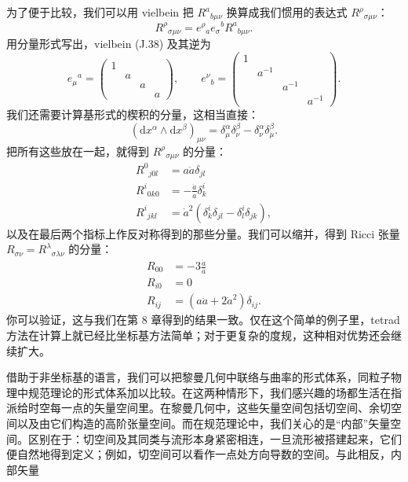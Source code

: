 为了便于比较，我们可以用 vielbein 把 $R^{a}{}_{b\mu\nu}$ 换算成我们惯用的表达式 $R^{\rho}{}_{\sigma\mu\nu}$：
\begin{equation*}
R^{\rho}{}_{\sigma\mu\nu} = e^{\rho}{}_{a}e_{\sigma}{}^{b}R^{a}{}_{b\mu\nu}.
\tag{J.49}
\end{equation*}
用分量形式写出，vielbein (J.38) 及其逆为
\begin{equation*}
e_{\mu}{}^{a} = \begin{pmatrix} 1 & & & \\ & a & & \\ & & a & \\ & & & a \end{pmatrix}, \qquad e^{\nu}{}_{b} = \begin{pmatrix} 1 & & & \\ & a^{-1} & & \\ & & a^{-1} & \\ & & & a^{-1} \end{pmatrix}. \tag{J.50}
\end{equation*}
我们还需要计算基形式的楔积的分量，这相当直接：
\begin{equation*}
(\mathrm{d}x^{\alpha}\wedge\mathrm{d}x^{\beta})_{\mu\nu} = \delta^{\alpha}_{\mu}\delta^{\beta}_{\nu} - \delta^{\alpha}_{\nu}\delta^{\beta}_{\mu}.
\tag{J.51}
\end{equation*}
把所有这些放在一起，就得到 $R^{\rho}{}_{\sigma\mu\nu}$ 的分量：
\begin{align*}
R^{0}{}_{j0l} &= a\ddot{a}\delta_{jl} \\
R^{i}{}_{0k0} &= -\frac{\ddot{a}}{a}\delta^{i}_{k} \\
R^{i}{}_{jkl} &= \dot{a}^{2}(\delta^{i}_{k}\delta_{jl} - \delta^{i}_{l}\delta_{jk}), \tag{J.52}
\end{align*}
以及在最后两个指标上作反对称得到的那些分量。我们可以缩并，得到 Ricci 张量 $R_{\sigma\nu} = R^{\lambda}{}_{\sigma\lambda\nu}$ 的分量：
\begin{align*}
R_{00} &= -3\frac{\ddot{a}}{a} \\
R_{i0} &= 0 \\
R_{ij} &= (a\ddot{a} + 2\dot{a}^{2})\delta_{ij}. \tag{J.53}
\end{align*}
你可以验证，这与我们在第 8 章得到的结果一致。仅在这个简单的例子里，tetrad 方法在计算上就已经比坐标基方法简单；对于更复杂的度规，这种相对优势还会继续扩大。

借助于非坐标基的语言，我们可以把黎曼几何中联络与曲率的形式体系，同粒子物理中规范理论的形式体系加以比较。在这两种情形下，我们感兴趣的场都生活在指派给时空每一点的矢量空间里。在黎曼几何中，这些矢量空间包括切空间、余切空间以及由它们构造的高阶张量空间。而在规范理论中，我们关心的是“内部”矢量空间。区别在于：切空间及其同类与流形本身紧密相连，一旦流形被搭建起来，它们便自然地得到定义；例如，切空间可以看作一点处方向导数的空间。与此相反，内部矢量

